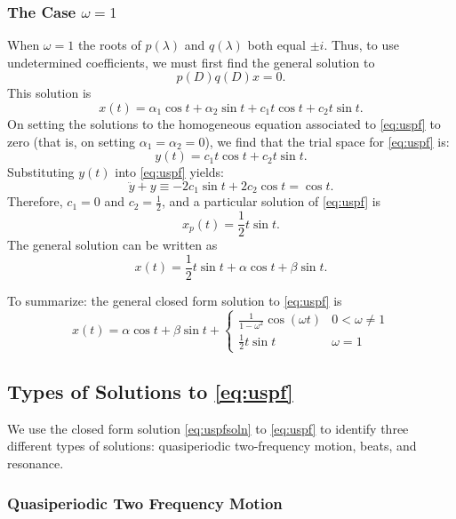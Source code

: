\documentclass{ximera}
\begin{document}
\subsubsection*{The Case $\omega= 1$}

When $\omega= 1$ the roots of $p(\lambda)$ and $q(\lambda)$ both equal 
$\pm i$.  Thus, to use undetermined coefficients, we must first find the 
general solution to 
\[
p(D)q(D)x = 0.
\]
This solution is 
\[
x(t) = \alpha_1\cos t + \alpha_2\sin t + c_1t\cos t + c_2t\sin t.
\]
On setting the solutions to the homogeneous equation associated to 
\eqref{eq:uspf} to zero (that is, on setting $\alpha_1=\alpha_2=0$), we 
find that the trial space for \eqref{eq:uspf} is:
\[
y(t) = c_1t\cos t + c_2t\sin t.
\]
Substituting $y(t)$ into \eqref{eq:uspf} yields:
\[
\ddot{y} + y \equiv -2c_1\sin t + 2c_2\cos t = \cos t.
\]
Therefore, $c_1=0$ and $c_2=\frac{1}{2}$, and a particular solution of 
\eqref{eq:uspf} is 
\[
x_p(t) = \frac{1}{2}t\sin t.
\]
The general solution can be written as
\[
x(t) = \frac{1}{2}t\sin t+\alpha\cos t+\beta\sin t.
\]

To summarize: the general closed form solution to \eqref{eq:uspf} is
\begin{equation}  \label{eq:uspfsoln}
x(t) = \alpha\cos t+\beta\sin t + \left\{\begin{array}{lr}
\frac{1}{1-\omega ^2}\cos(\omega t)  & 0<\omega\neq 1\\  
\frac{1}{2}t\sin t & \omega=1 \end{array}\right.\end{equation}

\subsection*{Types of Solutions to \eqref{eq:uspf}}

We use the closed form solution \eqref{eq:uspfsoln} to \eqref{eq:uspf} to
identify three different types of solutions: quasiperiodic two-frequency 
motion, beats, and resonance.

\subsubsection*{Quasiperiodic Two Frequency Motion}
\end{document}
